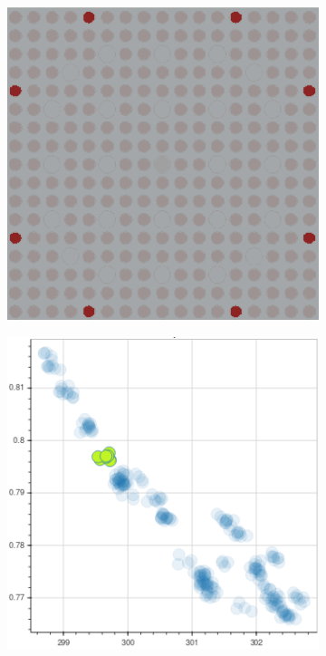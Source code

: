 \begin{figure}[h!]
\begin{subfigure}{0.45\textwidth}
  \caption{}
  \label{fig:chap10-fiss-mean-spect-ind-mgxs}
\end{subfigure}
\begin{subfigure}{0.45\textwidth}
  \centering
  \includegraphics[width=0.9\linewidth]{figures/unsupervised/features/assm-16/u235-fiss/mean-spect-ind-sum/geometry-2}
  \caption{}
  \label{fig:chap10-fiss-mean-spect-ind-geom-2}
\end{subfigure}%
\begin{subfigure}{0.45\textwidth}
  \centering
  \includegraphics[width=0.9\linewidth]{figures/unsupervised/features/assm-16/u235-fiss/mean-spect-ind-sum/mgxs-2}

\end{subfigure}
\end{figure}
